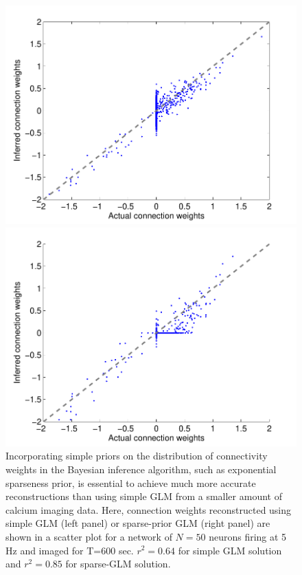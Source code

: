 \begin{figure}[h]
\centering
\begin{minipage}[c]{0.45\hsize}
\includegraphics[width=\hsize]{../figs/FigureA10_regular_sol}
\end{minipage}
\begin{minipage}[c]{0.45\hsize}
\includegraphics[width=\hsize]{../figs/FigureA10_sparse_sol}
\end{minipage}
\caption{Incorporating simple priors on the distribution of connectivity weights in the Bayesian inference algorithm, such as exponential sparseness prior, is essential to achieve much more accurate reconstructions than using simple GLM from a smaller amount of calcium imaging data. Here, connection weights reconstructed using simple GLM (left panel) or sparse-prior GLM (right panel) are shown in a scatter plot for a network of $N=50$ neurons firing at 5 Hz and imaged for T=600 sec. $r^2=0.64$ for simple GLM solution and $r^2=0.85$ for sparse-GLM solution.}
\label{fig:sparse}
\end{figure}

